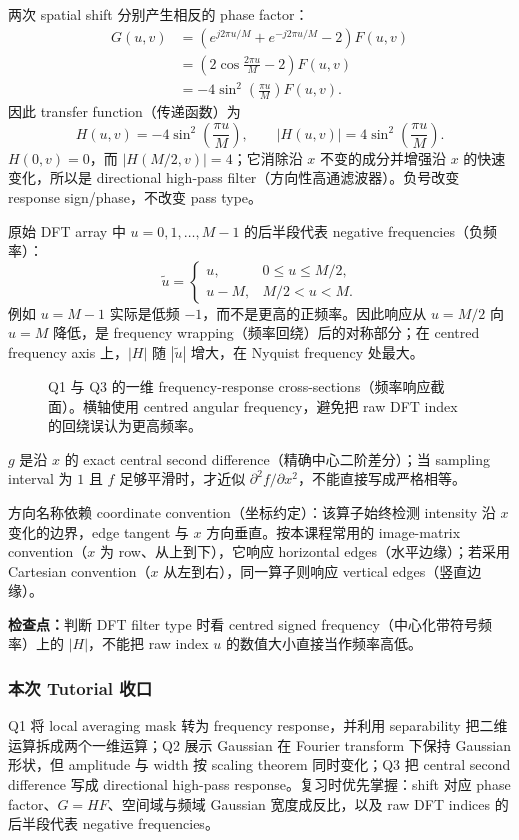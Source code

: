\begin{checkedsolution}
两次 spatial shift 分别产生相反的 phase factor：
\begin{align*}
  G(u,v)
  &=\left(e^{j2\pi u/M}+e^{-j2\pi u/M}-2\right)F(u,v)\\
  &=\left(2\cos\frac{2\pi u}{M}-2\right)F(u,v)\\
  &=\boxed{-4\sin^2\!\left(\frac{\pi u}{M}\right)F(u,v)}.
\end{align*}
因此 transfer function（传递函数）为
\[
  H(u,v)=-4\sin^2\!\left(\frac{\pi u}{M}\right),
  \qquad
  |H(u,v)|=4\sin^2\!\left(\frac{\pi u}{M}\right).
\]
$H(0,v)=0$，而 $|H(M/2,v)|=4$；它消除沿 $x$ 不变的成分并增强沿 $x$ 的快速变化，所以是 directional high-pass filter（方向性高通滤波器）。负号改变 response sign/phase，不改变 pass type。

原始 DFT array 中 $u=0,1,\ldots,M-1$ 的后半段代表 negative frequencies（负频率）：
\[
  \widetilde u=
  \begin{cases}
    u,&0\le u\le M/2,\\
    u-M,&M/2<u<M.
  \end{cases}
\]
例如 $u=M-1$ 实际是低频 $-1$，而不是更高的正频率。因此响应从 $u=M/2$ 向 $u=M$ 降低，是 frequency wrapping（频率回绕）后的对称部分；在 centred frequency axis 上，$|H|$ 随 $|\widetilde u|$ 增大，在 Nyquist frequency 处最大。

\begin{figure}[htbp]
  \centering
  \resizebox{0.96\textwidth}{!}{}
  \caption{Q1 与 Q3 的一维 frequency-response cross-sections（频率响应截面）。横轴使用 centred angular frequency，避免把 raw DFT index 的回绕误认为更高频率。}
  \label{fig:sc4061-tut03-frequency-responses}
\end{figure}

$g$ 是沿 $x$ 的 exact central second difference（精确中心二阶差分）；当 sampling interval 为 $1$ 且 $f$ 足够平滑时，才近似 $\partial^2f/\partial x^2$，不能直接写成严格相等。

方向名称依赖 coordinate convention（坐标约定）：该算子始终检测 intensity 沿 $x$ 变化的边界，edge tangent 与 $x$ 方向垂直。按本课程常用的 image-matrix convention（$x$ 为 row、从上到下），它响应 horizontal edges（水平边缘）；若采用 Cartesian convention（$x$ 从左到右），同一算子则响应 vertical edges（竖直边缘）。
\end{checkedsolution}

\textbf{检查点：}判断 DFT filter type 时看 centred signed frequency（中心化带符号频率）上的 $|H|$，不能把 raw index $u$ 的数值大小直接当作频率高低。

\subsubsection*{本次 Tutorial 收口}

Q1 将 local averaging mask 转为 frequency response，并利用 separability 把二维运算拆成两个一维运算；Q2 展示 Gaussian 在 Fourier transform 下保持 Gaussian 形状，但 amplitude 与 width 按 scaling theorem 同时变化；Q3 把 central second difference 写成 directional high-pass response。复习时优先掌握：shift 对应 phase factor、$G=HF$、空间域与频域 Gaussian 宽度成反比，以及 raw DFT indices 的后半段代表 negative frequencies。
